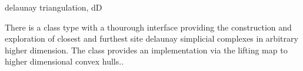 \begin{ccPackage}{delaunay triangulation, dD}
  
  There is a class type with a thourough interface providing the
  construction and exploration of closest and furthest site delaunay
  simplicial complexes in arbitrary higher dimension.  The class
   provides an
  implementation via the lifting map to higher dimensional
  convex hulls..


\end{ccPackage}


